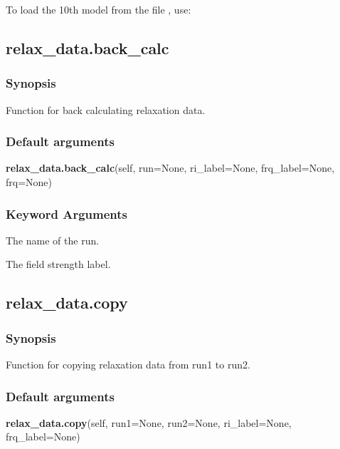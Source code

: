 To load the 10th model from the file 
, use:





\newpage

\subsection{relax\_data.back\_calc}


\subsubsection{Synopsis}

Function for back calculating relaxation data.

\subsubsection{Default arguments}

\textsf{\textbf{relax\_data.back\_calc}(self, run=None, ri\_label=None, frq\_label=None, frq=None)}


\subsubsection{Keyword Arguments}

  The name of the run.

  The field strength label.


\newpage

\subsection{relax\_data.copy}


\subsubsection{Synopsis}

Function for copying relaxation data from run1 to run2.

\subsubsection{Default arguments}

\textsf{\textbf{relax\_data.copy}(self, run1=None, run2=None, ri\_label=None, frq\_label=None)}


